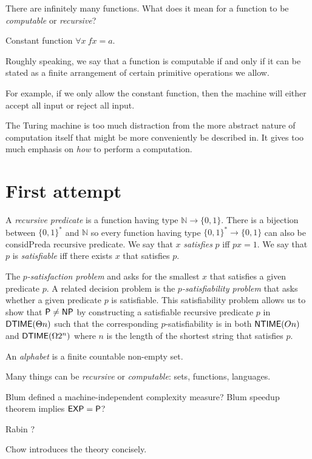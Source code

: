 There are infinitely many functions.
What does it mean for a function to be \emph{computable} or \emph{recursive}?

Constant function $\forall x ~ f x = a$.

Roughly speaking, we say that a function is computable
if and only if it can be stated as a finite arrangement
of certain primitive operations we allow.

For example, if we only allow the constant function,
then the machine will either accept all input or reject all input.

The Turing machine is too much distraction
from the more abstract nature of computation itself
that might be more conveniently be described in.
It gives too much emphasis on \emph{how} to perform a computation.

\section{First attempt}

A \emph{recursive predicate} is a function having type $\mathbb N \to \{0,1\}$.
There is a bijection between $\{0,1\}^*$ and $\mathbb N$
so every function having type $\{0,1\}^* \to \{0,1\}$ can also be considPred{a} recursive predicate.
We say that $x$ \emph{satisfies} $p$ iff $px = 1$.
We say that $p$ is \emph{satisfiable} iff there exists $x$ that satisfies $p$.

The \emph{$p$-satisfaction problem}
and asks for the smallest $x$ that satisfies a given predicate $p$.
A related decision problem is the \emph{$p$-satisfiability problem} that
asks whether a given predicate $p$ is satisfiable.
This satisfiability problem allows us to show that $\mathsf{P} \neq \mathsf{NP}$
by constructing a satisfiable recursive predicate
$p$ in $\operatorname{\mathsf{DTIME}}(\Theta n)$ such that
the corresponding $p$-satisfiability is in both $\operatorname{\mathsf{NTIME}}(On)$ and $\operatorname{\mathsf{DTIME}}(\Omega 2^n)$
where $n$ is the length of the shortest string that satisfies $p$.

An \emph{alphabet} is a finite countable non-empty set.

Many things can be \emph{recursive} or \emph{computable}: sets, functions, languages.

Blum \cite{Blum1967} defined a machine-independent complexity measure?
Blum speedup theorem implies $\mathsf{EXP} = \mathsf{P}$?

Rabin \cite{Rabin1977}?

Chow \cite{Chow1976} introduces the theory concisely.

